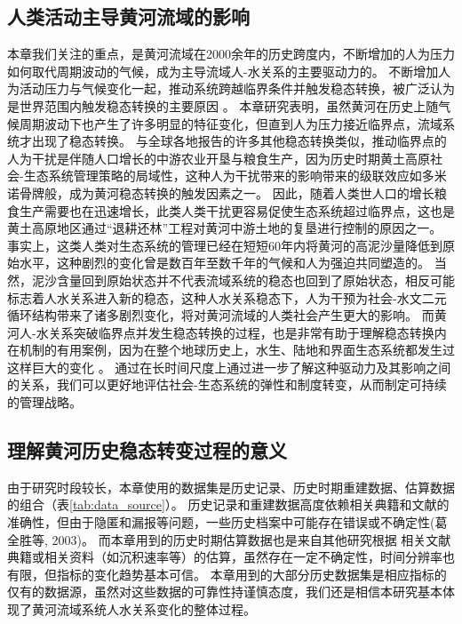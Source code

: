 
\subsection{人类活动主导黄河流域的影响}
\label{ch3:sec:human-activity}

本章我们关注的重点，是黄河流域在2000余年的历史跨度内，不断增加的人为压力如何取代周期波动的气候，成为主导流域人-水关系的主要驱动力的。
不断增加人为活动压力与气候变化一起，推动系统跨越临界条件并触发稳态转换，被广泛认为是世界范围内触发稳态转换的主要原因 \cite{scheffer2001,scheffer2003}。
本章研究表明，虽然黄河在历史上随气候周期波动下也产生了许多明显的特征变化，但直到人为压力接近临界点，流域系统才出现了稳态转换。
与全球各地报告的许多其他稳态转换类似，推动临界点的人为干扰是伴随人口增长的中游农业开垦与粮食生产，因为历史时期黄土高原社会-生态系统管理策略的局域性，这种人为干扰带来的影响带来的级联效应如多米诺骨牌般，成为黄河稳态转换的触发因素之一\cite{rocha2018}。
因此，随着人类世人口的增长粮食生产需要也在迅速增长，此类人类干扰更容易促使生态系统超过临界点，这也是黄土高原地区通过“退耕还林”工程对黄河中游土地的复垦进行控制的原因之一。
事实上，这类人类对生态系统的管理已经在短短60年内将黄河的高泥沙量降低到原始水平，这种剧烈的变化曾是数百年至数千年的气候和人为强迫共同塑造的\cite{wang2016e, ji2018}。
当然，泥沙含量回到原始状态并不代表流域系统的稳态也回到了原始状态，相反可能标志着人水关系进入新的稳态，这种人水关系稳态下，人为干预为社会-水文二元循环结构带来了诸多剧烈变化，将对黄河流域的人类社会产生更大的影响。
而黄河人-水关系突破临界点并发生稳态转换的过程，也是非常有助于理解稳态转换内在机制的有用案例，因为在整个地球历史上，水生、陆地和界面生态系统都发生过这样巨大的变化 \cite{hughes2013, rocha2018}。
通过在长时间尺度上通过进一步了解这种驱动力及其影响之间的关系，我们可以更好地评估社会-生态系统的弹性和制度转变，从而制定可持续的管理战略\cite{scheffer2003}。

\subsection{理解黄河历史稳态转变过程的意义}

由于研究时段较长，本章使用的数据集是历史记录、历史时期重建数据、估算数据的组合（表\ref{tab:data_source}）。
历史记录和重建数据高度依赖相关典籍和文献的准确性，但由于隐匿和漏报等问题，一些历史档案中可能存在错误或不确定性(葛全胜等, 2003)。
而本章用到的历史时期估算数据也是来自其他研究根据 相关文献典籍或相关资料（如沉积速率等）的估算，虽然存在一定不确定性，时间分辨率也有限，但指标的变化趋势基本可信。
本章用到的大部分历史数据集是相应指标的仅有的数据源，虽然对这些数据的可靠性持谨慎态度，我们还是相信本研究基本体现了黄河流域系统人水关系变化的整体过程。

